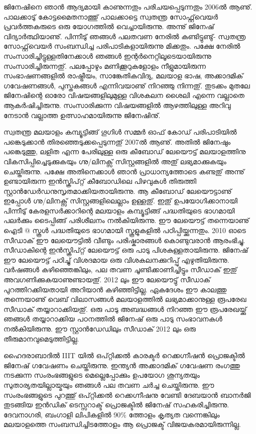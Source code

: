 \newpage
{}
 
ജിനേഷിനെ ഞാന്‍ ആദ്യമായി കാണുന്നതും പരിചയപ്പെടുന്നതും 2006ല്‍ ആണു്. പാലക്കാടു് കോട്ടമൈതനാത്തു് പാലക്കാട്ടെ സ്വതന്ത്ര സോഫ്റ്റ്‌‌വെയര്‍ പ്രവര്‍ത്തകരുടെ ഒരു യോഗത്തില്‍ വെച്ചായിരുന്നു. അന്നു് ജിനേഷ് വിദ്യാര്‍ത്ഥിയാണു്. പിന്നീടു് ഞങ്ങള്‍ പലതവണ നേരില്‍ കണ്ടിട്ടുണ്ടു്- സ്വതന്ത്ര സോഫ്റ്റ്‌വെയര്‍ സംബന്ധിച്ച പരിപാടികളായിരുന്നു മിക്കതും. പക്ഷേ നേരില്‍ സംസാരിച്ചിട്ടുള്ളതിനേക്കാള്‍ ഞങ്ങള്‍ ഇന്റര്‍നെറ്റിലൂടെയായിരുന്നു സംസാരിച്ചിരുന്നതു്. പലപ്പോഴും മണിക്കൂറുകളോളം നീളുമായിരുന്ന സംഭാഷണങ്ങളില്‍ രാഷ്ട്രീയം, സാങ്കേതികവിദ്യ, മലയാള ഭാഷ, അക്കാദമിക് ഗവേഷണങ്ങള്‍, പുസ്തകങ്ങള്‍ എന്നിവയാണു് നിറഞ്ഞു നിന്നതു്. തുടക്കം മുതലേ ജിനേഷിന്റെ ഓരോ വിഷയങ്ങളിലുമുള്ള വിശകലന ശൈലി എന്നെ വല്ലാതെ ആകര്‍ഷിച്ചിരുന്നു. സംസാരിക്കുന്ന വിഷയങ്ങളില്‍ ആഴത്തിലുള്ള അറിവു നേടാന്‍ വല്ലാത്ത ഉത്സാഹമായിരുന്നു ജിനേഷിനു്.
 
സ്വതന്ത്ര മലയാളം കമ്പ്യൂട്ടിങ്ങ് ഗൂഗിള്‍ സമ്മര്‍ ഓഫ് കോഡ് പരിപാടിയില്‍ പങ്കെടുക്കാന്‍ തിരഞ്ഞെടുക്കപ്പെടുന്നതു് 2007ല്‍ ആണു്. അതില്‍ ജിനേഷും പങ്കെടുത്തു, ലളിത എന്ന പേരിലുള്ള ഒരു കീബോഡ് ലേയൌട്ട്  മലയാളത്തിനു വികസിപ്പിച്ചെടുക്കുകയും  ഗ്നു/ലിനക്സ് സിസ്റ്റങ്ങളില്‍ അതു് ലഭ്യമാക്കുകയും ചെയ്തിരുന്നു. പക്ഷേ അതിനെക്കാള്‍ ഞാന്‍ പ്രാധാന്യത്തോടെ കണ്ടതു് അന്നു് ഉണ്ടായിരുന്ന ഇന്‍സ്ക്രിപ്റ്റ് കീബോഡിലെ പിഴവുകള്‍ തിരുത്തി സ്റ്റാന്‍ഡേര്‍ഡനുസൃതമാക്കിയതായിരുന്നു. ആ കീബോഡ് ലേയൌട്ടാണു്  ഇപ്പോള്‍ ഗ്നു/ലിനക്സ് സിസ്റ്റങ്ങളിലെല്ലാം ഉള്ളതു്. ഇതു്  ഉപയോഗിക്കാനായി പിന്നീടു് കേരളസര്‍ക്കാറിന്റെ മലയാളം കമ്പ്യൂട്ടിങ്ങ് പദ്ധതിയുടെ ഭാഗമായി പലര്‍ക്കും ടൈപ്പിങ്ങ് പരിശീലനം നല്‍കിയിരുന്നു. ഈ ലേയൌട്ട് തന്നെയാണു് ഐടി @ സ്കൂള്‍ പദ്ധതിയുടെ ഭാഗമായി സ്കൂളുകളില്‍ പഠിപ്പിയ്ക്കുന്നതും. 2010 ഓടെ സീഡാക്‍ ഈ ലേയൌട്ടില്‍ വീണ്ടും പരിഷ്കാരങ്ങള്‍ കൊണ്ടുവരാന്‍ ആരംഭിച്ചു. സീഡാകിന്റെ ഇന്‍സ്ക്രിപ്റ്റ് ലേയൌട്ട് ഒരു പാടു പിശകുള്ളതായിരുന്നു. ജിനേഷ് ഈ ലേയൌട്ട് പഠിച്ചു് വിശദമായ ഒരു വിശകലനക്കുറിപ്പു് എഴുതിയിരുന്നു. വര്‍ഷങ്ങള്‍ കഴിഞ്ഞെങ്കിലും, പല തവണ ചൂണ്ടിക്കാണിച്ചിട്ടും സീഡാക്‍ ഇതു് അവഗണിക്കുകയാണുണ്ടായതു്. 2012 ലും ഈ ലേയൌട്ടു് സീഡാക്‍ പുറത്തിറക്കിയതായി അറിയാന്‍ കഴിഞ്ഞിട്ടില്ല. ഏകദേശം ഈ കാലത്തു തന്നെയാണു് വെബ് വിലാസങ്ങള്‍ മലയാളത്തില്‍ ലഭ്യമാക്കാനുള്ള രൂപരേഖ സീഡാക്‍ തയ്യാറാക്കിയതു്. ഒരു പാടു അബദ്ധങ്ങള്‍ നിറഞ്ഞ ഈ രൂപരേഖയ്ക്കു് ഞങ്ങള്‍ തയ്യാറാക്കിയ പഠനത്തില്‍ ജിനേഷ് ഒരു പാടു സംഭാവനകള്‍ നല്‍കിയിരുന്നു. ഈ സ്റ്റാന്‍ഡേഡിലും സീഡാക്‍ 2012 ലും ഒരു തീരുമാനവുമെടുത്തിട്ടില്ല.
 
ഹൈദരാബാദില്‍ IIIT യില്‍ ഒപ്റ്റിക്കല്‍ കാരക്ടര്‍ റെക്കഗ്നീഷന്‍ പ്രൊജക്ടില്‍ ജിനേഷ് ഗവേഷണം ചെയ്തിരുന്നു. ഇന്ത്യന്‍ അക്കാദമിക് ഗവേഷണ രംഗത്തു നടക്കുന്ന സംരംഭങ്ങളുടെ മെല്ലെപ്പോക്കും ഉപയോഗ ശൂന്യതയും സുതാര്യതയില്ലായ്മയും ഞങ്ങള്‍ പല തവണ ചര്‍ച്ച ചെയ്തിരുന്നു. ഈ സംരംഭങ്ങളുടെ പുറത്തു് ഒപ്റ്റിക്കല്‍ റെക്കഗ്നീഷനു വേണ്ടി ദേബയാന്‍ ബാനര്‍ജി തുടങ്ങിയ ഇന്‍ഡിക് ടെസ്സറാക്ട് പ്രൊജക്ടില്‍ ജിനേഷ് സഹകരിച്ചിരുന്നു. ദേവനാഗരി, ബംഗാളി ലിപികളില്‍ 90\% ത്തോളം കൃത്യത വന്നെങ്കിലും മലയാളത്തെ സംബന്ധിച്ചിടത്തോളം ആ പ്രൊജക്ട് വിജയകരമായിരുന്നില്ല.
 
